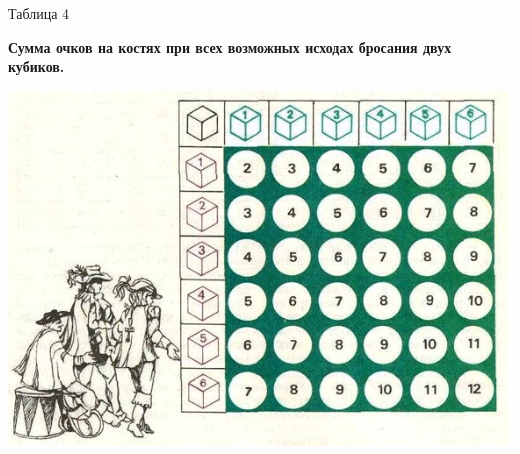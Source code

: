 \large
\setcounter{page}{39}
\begin{flushright}
Таблица 4
\end{flushright}

\begin{center}
{\bf Сумма очков на костях при всех возможных исходах бросания двух кубиков.}

\includegraphics[scale=1]{img.jpg}
\end{center}

